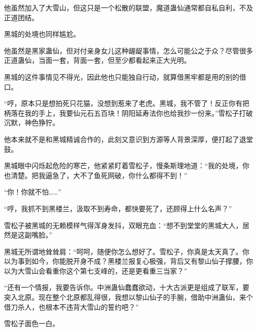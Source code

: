 \begin{this_body}
他虽然加入了大雪山，但这只是一个松散的联盟，魔道蛊仙通常都自私自利，不及正道团结。

黑城的处境也同样尴尬。

他虽然是黑家蛊仙，但对付亲身女儿这种龌龊事情，怎么可能公之于众？尽管很多正道蛊仙，当面一套，背面一套，但至少都看起来正大光明。

黑城的这件事情见不得光，因此他也只能独自行动，就算借黑牢都是用的别的借口。

“哼，原本只是想拍死只花猫，没想到惹来了老虎。黑城，我不管了！反正你有把柄落在我的手上，我要仙元石五百块！阴阳延寿法你也给我抄一份来。”雪松子打破沉默，神色狰狞。

他本来就不是和黑城精诚合作的，此刻又意识到方源等人背景深厚，便打起了退堂鼓。

黑城眼中闪烁起危险的寒芒，他紧紧盯着雪松子，慢条斯理地道：“我的处境，你也清楚。把我逼急了，大不了鱼死网破，你什么都得不到！”

“你！你就不怕……”

“哼，我抓不到黑楼兰，汲取不到寿命，都快要死了，还顾得上什么名声？”

雪松子被黑城的无赖模样气得浑身发抖，双眼充血：“想不到堂堂的黑城大人，居然是这副嘴脸。”

黑城无所谓地耸耸肩：“呵呵，随便你怎么想好了。雪松子，你真是太天真了。你以为事到如今，你能脱开身不成？黑楼兰报复心极强，背后又有黎山仙子撑腰，你以为大雪山会看重你这个第七支峰的，还是更看重三当家？”

“还有一个情报，我要告诉你。中洲蛊仙蠢蠢欲动，十大古派更是组成了联军，要突入北原。现在整个北原都乱得很，我想以黎山仙子的手腕，借助中洲蛊仙，来个借刀杀人，也根本不违背大雪山的誓约吧？”

雪松子面色一白。

\end{this_body}

